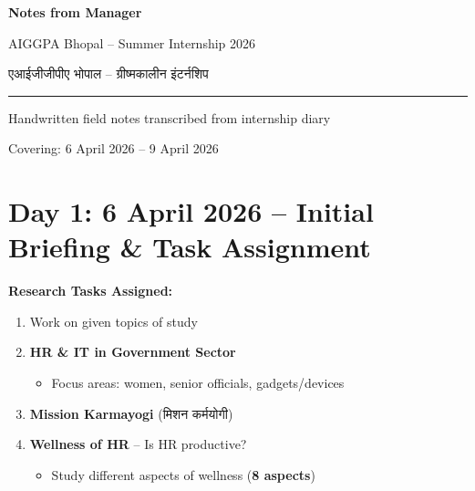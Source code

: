 \documentclass[12pt,a4paper]{article}
\newcommand{\hindi}[1]{{\hindifont #1}}
\begin{document}
\begin{center}
\vspace*{0.5cm}

{\Huge\bfseries\textcolor{govblue}{Notes from Manager}}

\vspace{0.3cm}

{\Large\textcolor{accent1}{AIGGPA Bhopal -- Summer Internship 2026}}

{\large\textcolor{accent1}{\hindi{एआईजीजीपीए भोपाल -- ग्रीष्मकालीन इंटर्नशिप}}}

\vspace{0.5cm}

\rule{0.6\textwidth}{1pt}

\vspace{0.3cm}

{\large Handwritten field notes transcribed from internship diary}

{\normalsize Covering: 6 April 2026 -- 9 April 2026}

\end{center}

\vspace{1cm}

\tableofcontents
\newpage

\section{Day 1: 6 April 2026 -- Initial Briefing \& Task Assignment}

\begin{datebox}
\textbf{Research Tasks Assigned:}
\begin{enumerate}[label=\textbf{\arabic*.}, leftmargin=1.5cm]
  \item[\textbf{K} $\rightarrow$] Work on given topics of study
  \item[\textbf{K} $\rightarrow$] \textbf{HR \& IT in Government Sector}
    \begin{itemize}
      \item Focus areas: women, senior officials, gadgets/devices
    \end{itemize}
  \item[\textbf{S} $\rightarrow$] \textbf{Mission Karmayogi} (\hindi{मिशन कर्मयोगी})
  \item[\textbf{H} $\rightarrow$] \textbf{Wellness of HR} -- Is HR productive?
    \begin{itemize}
      \item Study different aspects of wellness (\textbf{8 aspects})
    \end{itemize}
\end{enumerate}
\end{datebox}
\end{document}
